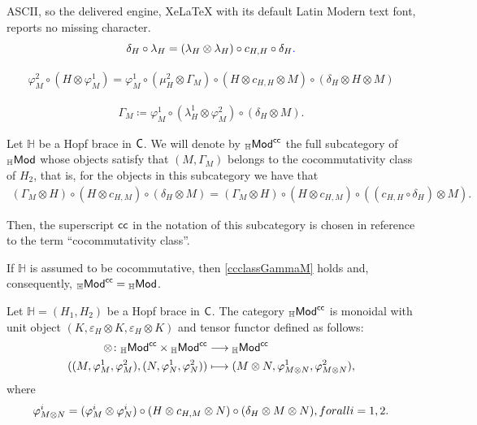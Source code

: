 \documentclass[10pt,a4paper]{amsart}
\begin{document}
ASCII, so the delivered engine, XeLaTeX with its default Latin Modern text font, reports no missing character.
\begin{equation}
\label{a-antip2}
	\delta_{H}\circ\lambda_{H}=(\lambda_{H}\otimes\lambda_{H})\circ c_{H,H}\circ \delta_{H}{\color{blue} .}
\end{equation}

\begin{gather}\label{compatmodH}
\varphi_{M}^{2}\circ(H\otimes\varphi_{M}^{1})=\varphi_{M}^{1}\circ(\mu_{H}^{2}\otimes\Gamma_{M})\circ(H\otimes c_{H,H}\otimes M)\circ(\delta_{H}\otimes H\otimes M)
\end{gather}

\begin{gather}\label{GammaMdef}
\Gamma_{M}\coloneqq\varphi_{M}^{1}\circ(\lambda_{H}^{1}\otimes\varphi_{M}^{2})\circ(\delta_{H}\otimes M).
\end{gather}

\begin{definition}
	Let $\mathbb{H}$ be a Hopf brace in ${\sf C}$. We will denote by ${}_{\mathbb{H}}{\sf Mod}^{{\sf cc}}$ the full subcategory of ${}_{\mathbb{H}}{\sf Mod}$ whose objects satisfy that $(M,\Gamma_{M})$ belongs to the cocommutativity class of $H_{2}$, that is, for the objects in this subcategory we have that
	\begin{gather}\label{ccclassGammaM}
		(\Gamma_{M}\otimes H)\circ(H\otimes c_{H,M})\circ(\delta_{H}\otimes M)=(\Gamma_{M}\otimes H)\circ(H\otimes c_{H,M})\circ((c_{H,H}\circ\delta_{H})\otimes M).
	\end{gather}
	
	Then, the superscript ${\sf cc}$ in the notation of this subcategory is chosen in reference to the term ``cocommutativity class''. 
	
	If $\mathbb{H}$ is assumed to be cocommutative, then \eqref{ccclassGammaM} holds and, consequently,  ${}_{\mathbb{H}}{\sf Mod}^{{\sf cc}}={}_{\mathbb{H}}{\sf Mod}$.
\end{definition}

\begin{theorem}
	Let $\mathbb{H}=(H_{1},H_{2})$ be a Hopf brace in ${\sf C}$. The category ${}_{\mathbb{H}}{\sf Mod}^{{\sf cc}}$ is monoidal with unit object $(K,\varepsilon_{H}\otimes K,\varepsilon_{H}\otimes K)$ and tensor functor defined as follows:
	\begin{align*}
		\otimes\colon {}_{\mathbb{H}}{\sf Mod}^{{\sf cc}}\times {}_{\mathbb{H}}{\sf Mod}^{{\sf cc}}&\longrightarrow {}_{\mathbb{H}}{\sf Mod}^{{\sf cc}}\\((M,\varphi_{M}^{1},\varphi_{M}^{2}),(N,\varphi_{N}^{1},\varphi_{N}^{2}))&\longmapsto(M\otimes N,\varphi_{M\otimes N}^{1},\varphi_{M\otimes N}^{2}),
	\end{align*}
	where
	\begin{gather}\label{usualtensoraction}
		\varphi_{M\otimes N}^{i}=(\varphi_{M}^{i}\otimes\varphi_{N}^{i})\circ(H\otimes c_{H,M}\otimes N)\circ(\delta_{H}\otimes M\otimes N),\textnormal{ for all }i=1,2.
	\end{gather}
\end{theorem}
\end{document}
